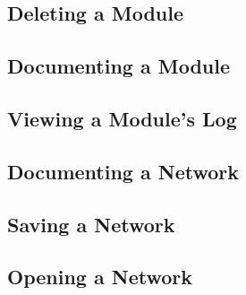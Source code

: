 \subsection{Deleting a Module}
\label{sec:deletemod}


\subsection{Documenting a Module}
\label{sec:docmodule}


\subsection{Viewing a Module's Log}
\label{sec:viewmodslog}


\subsection{Documenting a Network}
\label{sec:docnetwork}


\subsection{Saving a Network}
\label{sec:savenet}


\subsection{Opening a Network}
\label{sec:opennet}


